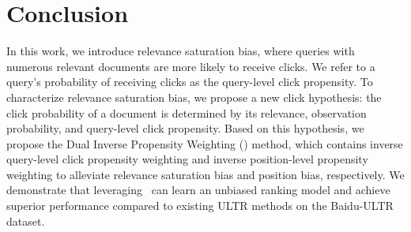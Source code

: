 \section{Conclusion}
In this work, we introduce relevance saturation bias, where queries with numerous relevant documents are more likely to receive clicks. We refer to a query's probability of receiving clicks as the query-level click propensity. To characterize relevance saturation bias, we propose a new click hypothesis: the click probability of a document is determined by its relevance, observation probability, and query-level click propensity. Based on this hypothesis, we propose the Dual Inverse Propensity Weighting (\m) method, which contains inverse query-level click propensity weighting and inverse position-level propensity weighting to alleviate relevance saturation bias and position bias, respectively. We demonstrate that leveraging \m~can learn an unbiased ranking model and achieve superior performance compared to existing ULTR methods on the Baidu-ULTR dataset. 